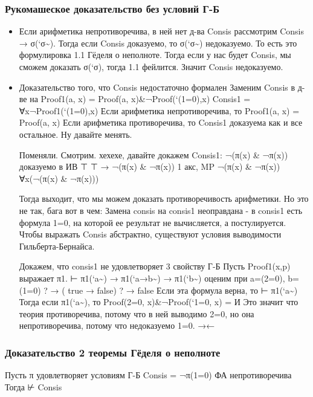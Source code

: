 \documentclass[11pt]{article}
\begin{document}
\subsubsection{Рукомашеское доказательство без условий Г-Б}
\label{sec-14-2-1}
\begin{itemize}
\item Если арифметика непротиворечива, в ней нет д-ва Consis
рассмотрим Consis → σ(`σ\textasciitilde{}).
Тогда если Consis доказуемо, то σ(`σ\textasciitilde{}) недоказуемо.
То есть это формулировка 1.1 Гёделя о неполноте.
Тогда если у нас будет Consis, мы сможем доказать
σ(`σ), тогда 1.1 фейлится. Значит Consis недоказуемо.

\item Доказательство того, что Consis недостаточно формален
Заменим Consis в д-ве на
Proof1(a, x) = Proof(a, x)\&¬Proof(`(1=0),x)
Consis1 = ∀x¬Proof1(`(1=0),x)
Если арифметика непротиворечива, то Proof1(a, x) = Proof(a, x)
Если арифметика противоречива, то Consis1 доказуема как и все
остальное.
Ну давайте менять.

Поменяли. Смотрим. хехехе, давайте докажем Consis1:
¬(π(x) \& ¬π(x))              доказуемо в ИВ
⊤
⊤ → ¬(π(x) \& ¬π(x))          1 акс, MP
¬(π(x) \& ¬π(x))
∀x(¬(π(x) \& ¬π(x)))

Тогда выходит, что мы можем доказать противоречивость арифметики.
Но это не так, бага вот в чем:
Замена consis на consis1 неоправдана - в consis1 есть
формула 1=0, на которой ее результат не вычисляется, а
постулируется.
Чтобы выражать Consis абстрактно, существуют условия выводимости
Гильберта-Бернайса.

Докажем, что consis1 не удовлетворяет 3 свойству Г-Б
Пусть Proof1(x,p) выражает π1.
⊢ π1(`a\textasciitilde{}) → π1(`a→b\textasciitilde{}) → π1(`b\textasciitilde{}) оценим при a=(2=0), b=(1=0)
?       → (   true  →  false)
?       → false
Если эта формула верна, то ⊢ π1(`a\textasciitilde{})
Тогда если π1(`a\textasciitilde{}), то Proof(2=0, x)\&¬Proof(`1=0, x) = И
Это значит что теория противоречива, потому что в ней выводимо 2=0,
но она непротиворечива, потому что недоказуемо 1=0. →←
\end{itemize}
\subsubsection{Доказательство 2 теоремы Гёделя о неполноте}
\label{sec-14-2-2}
Пусть π удовлетворяет условиям Г-Б
Consis = ¬π(1=0)
ФА непротиворечива
Тогда ⊬ Consis
\end{document}
